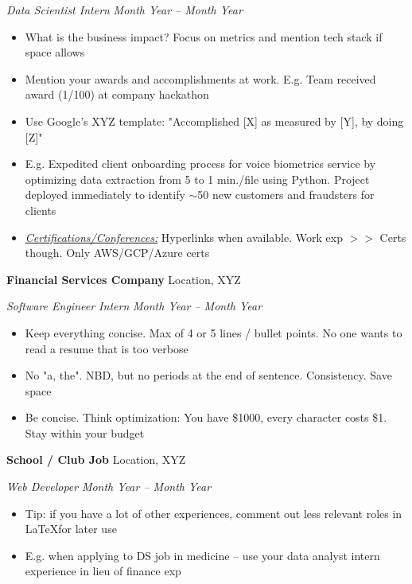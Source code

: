 \documentclass[letterpaper,10pt]{article}
\begin{document}
    \textit { Data Scientist Intern} \hfill \textit {Month Year -- Month Year}
    \begin{itemize}[noitemsep, nolistsep]
    \renewcommand\labelitemi{\scriptsize$\bullet$}

        \item What is the business impact? Focus on metrics and mention tech stack if space allows
        \item Mention your awards and accomplishments at work. E.g. Team received award (1/100) at company hackathon
        \item Use Google's XYZ template: "Accomplished [X] as measured by [Y], by doing [Z]"
        \item E.g. Expedited client onboarding process for voice biometrics service by optimizing data extraction from 5 to 1 min./file using Python. Project deployed immediately to identify $\sim$50 new customers and fraudsters for clients
        \item \textit {\underline{Certifications/Conferences:}} Hyperlinks when available. Work exp $>>$ Certs though. Only AWS/GCP/Azure certs%
        
    \end{itemize}
    
    \vspace{2.25mm}

    \textbf {Financial Services Company} \hfill Location, XYZ
    
    \textit { Software Engineer Intern} \hfill \textit {Month Year -- Month Year}
    \begin{itemize}[noitemsep, nolistsep]
    \renewcommand\labelitemi{\scriptsize$\bullet$}
        \item Keep everything concise. Max of 4 or 5 lines / bullet points. No one wants to read a resume that is too verbose 
        \item No "a, the". NBD, but no periods at the end of sentence. Consistency. Save space
        \item Be concise. Think optimization: You have \$1000, every character costs \$1. Stay within your budget
    \end{itemize}

    \vspace{2.25mm}
    
    \textbf {School / Club Job} \hfill Location, XYZ
    
    \textit { Web Developer}
    \hfill \textit {Month Year -- Month Year}
    \begin{itemize}[noitemsep, nolistsep]
    \renewcommand\labelitemi{\scriptsize$\bullet$}
        \item Tip: if you have a lot of other experiences, comment out less relevant roles in \LaTeX for later use
        \item E.g. when applying to DS job in medicine -- use your data analyst intern experience in lieu of finance exp
    \end{itemize}
    
\end{document}
